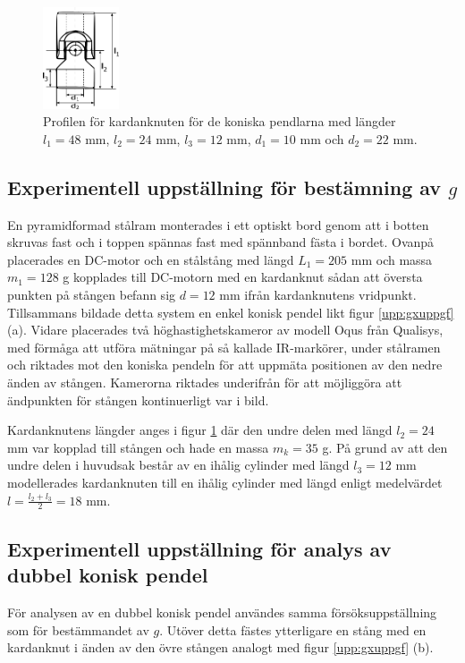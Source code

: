 \documentclass[12pt,a4paper]{article}
\begin{document}
\begin{figure}
    \centering
    \vspace{-20px}
    \includegraphics[width = 0.20\textwidth]{gbilder/text6405-4-1-1.png}
    \caption{Profilen för kardanknuten för de koniska pendlarna med längder $l_1 = 48$ mm, $l_2 = 24$ mm, $l_3 = 12$ mm, $d_1 = 10$ mm och $d_2 = 22$ mm.}
    \label{fig:Kardanknut}
\end{figure}

\subsection{Experimentell uppställning för bestämning av $g$}

En pyramidformad stålram monterades i ett optiskt bord genom att i botten skruvas fast och i toppen spännas fast med spännband fästa i bordet. Ovanpå placerades en DC-motor och en stålstång med längd $L_1 = 205$ mm och massa $m_1 = 128$ g kopplades till DC-motorn med en kardanknut sådan att översta punkten på stången befann sig $d = 12$ mm ifrån kardanknutens vridpunkt. Tillsammans bildade detta system en enkel konisk pendel likt figur \ref{upp:gxuppgf} (a). Vidare placerades två höghastighetskameror av modell Oqus från Qualisys, med förmåga att utföra mätningar på så kallade IR-markörer, under stålramen och riktades mot den koniska pendeln för att uppmäta positionen av den nedre änden av stången. Kamerorna riktades underifrån för att möjliggöra att ändpunkten för stången kontinuerligt var i bild.

Kardanknutens längder anges i figur \ref{fig:Kardanknut} där den undre delen med längd $l_2 = 24$ mm var kopplad till stången och hade en massa $m_k = 35$ g. På grund av att den undre delen i huvudsak består av en ihålig cylinder med längd $l_3 = 12 $ mm modellerades kardanknuten till en ihålig cylinder med längd enligt medelvärdet $l = \frac{l_2 + l_3}{2} = 18$ mm.


\subsection{Experimentell uppställning för analys av dubbel konisk pendel}
För analysen av en dubbel konisk pendel användes samma försöksuppställning som för bestämmandet av $g$. Utöver detta fästes ytterligare en stång med en kardanknut i änden av den övre stången analogt med figur \ref{upp:gxuppgf} (b).
\end{document}
